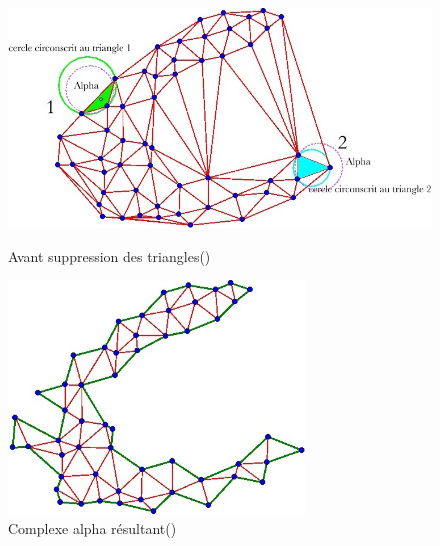 \documentclass[a4paper,10pt]{report}
\begin{document}
\begin{figure}[h!]
\begin{minipage}{.5\textwidth}
	\centering
	\includegraphics[width=1.1\textwidth]{Delaunay-avant.jpg}
	\caption{Avant suppression des triangles(\cite{glace})}
    \label{Delaunay-avant}
\end{minipage}%
\begin{minipage}{.5\textwidth}
	\centering
	\includegraphics[width=0.7\textwidth]{Delaunay-apres.jpg}
	\caption{Complexe alpha résultant(\cite{glace})}
    \label{Delaunay-apres}
\end{minipage}
\end{figure}
\end{document}
